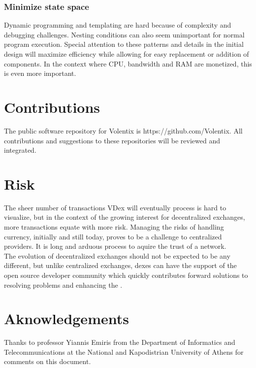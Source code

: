 \documentclass[]{article}
\begin{document}
	\subsubsection{Minimize state space}
	Dynamic programming and templating are hard because of complexity and debugging challenges. 
	Nesting conditions can also seem unimportant for normal program execution.
	Special attention to these patterns and details in the initial design will maximize efficiency while allowing for easy replacement or addition of components.   
	In the context where CPU, bandwidth and RAM are monetized, this is even more important. 

\section{Contributions}
The public software repository for Volentix is https://github.com/Volentix.
All contributions and suggestions to these repositories will be reviewed and integrated. 
	
\section{Risk}
	The sheer number of transactions VDex will eventually process is hard to visualize, 
	but in the context of the growing interest for decentralized exchanges, more transactions equate with more risk. 
	Managing the risks of handling currency, initially and still today, proves to be a challenge to centralized providers. It is long and arduous process to aquire
	the trust of a network.\\
	 The evolution of decentralized exchanges should not be expected to be any different, but unlike centralized exchanges, 
	dexes can have the support of the open source developer community which quickly contributes 
	forward solutions to resolving problems and enhancing the . \\
	

\paragraph{}
\paragraph{}	

\section{Aknowledgements}
Thanks to professor Yiannis Emiris
from the Department of Informatics and Telecommunications 
at the National and Kapodistrian University of Athens for comments on this document.
	
\end{document}
